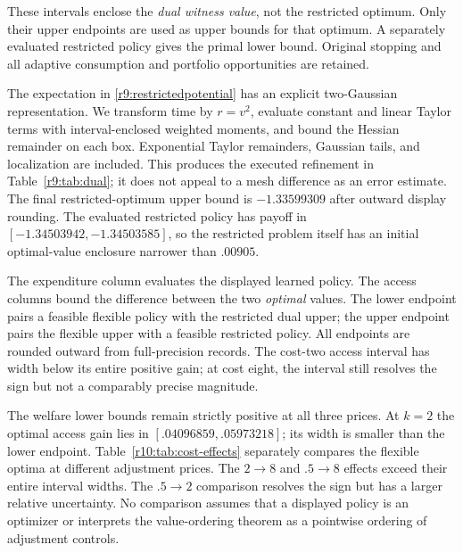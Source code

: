 \begin{table}[t]
\centering\small
\caption{Refining the no-adjustment dual witness}\label{r9:tab:dual}

\par\smallskip\footnotesize These intervals enclose the \emph{dual witness value}, not the restricted optimum. Only their upper endpoints are used as upper bounds for that optimum. A separately evaluated restricted policy gives the primal lower bound. Original stopping and all adaptive consumption and portfolio opportunities are retained.
\end{table}

The expectation in \eqref{r9:restrictedpotential} has an explicit two-Gaussian representation. We transform time by $r=v^2$, evaluate constant and linear Taylor terms with interval-enclosed weighted moments, and bound the Hessian remainder on each box. Exponential Taylor remainders, Gaussian tails, and localization are included. This produces the executed refinement in Table~\ref{r9:tab:dual}; it does not appeal to a mesh difference as an error estimate. The final restricted-optimum upper bound is $-1.33599309$ after outward display rounding. The evaluated restricted policy has payoff in $[-1.34503942,-1.34503585]$, so the restricted problem itself has an initial optimal-value enclosure narrower than $.00905$.

\begin{table}[t]
\centering\scriptsize
\caption{Certified current-policy expenditures and optimal value of access}\label{r9:tab:economics}

\par\smallskip\footnotesize The expenditure column evaluates the displayed learned policy. The access columns bound the difference between the two \emph{optimal} values. The lower endpoint pairs a feasible flexible policy with the restricted dual upper; the upper endpoint pairs the flexible upper with a feasible restricted policy. All endpoints are rounded outward from full-precision records. The cost-two access interval has width below its entire positive gain; at cost eight, the interval still resolves the sign but not a comparably precise magnitude.
\end{table}

The welfare lower bounds remain strictly positive at all three prices. At $k=2$ the optimal access gain lies in $[.04096859,.05973218]$; its width is smaller than the lower endpoint. Table~\ref{r10:tab:cost-effects} separately compares the flexible optima at different adjustment prices. The $2\to8$ and $.5\to8$ effects exceed their entire interval widths. The $.5\to2$ comparison resolves the sign but has a larger relative uncertainty. No comparison assumes that a displayed policy is an optimizer or interprets the value-ordering theorem as a pointwise ordering of adjustment controls.

